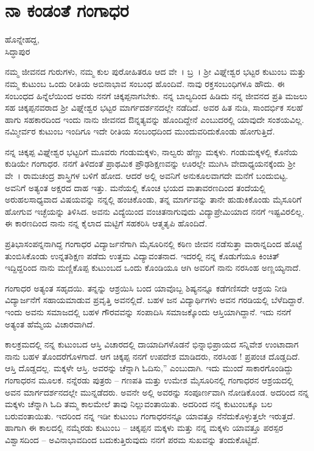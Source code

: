 \chapter{ನಾ ಕಂಡಂತೆ ಗಂಗಾಧರ}

\begin{center}
\smallskip

ಹೊನ್ನೇಹದ್ದ,\\ 
ಸಿದ್ಧಾಪುರ
\addrule
\end{center}

ನಮ್ಮ ಜೀವನದ ಗುರುಗಳು, ನಮ್ಮ ಕುಲ ಪುರೋಹಿತರೂ ಆದ ವೇ~। ಬ್ರ~। ಶ್ರೀ ವಿಘ್ನೇಶ್ವರ ಭಟ್ಟರ ಕುಟುಂಬ ಮತ್ತು ನಮ್ಮ ಕುಟುಂಬ ಒಂದು ರೀತಿಯ ಅಬಿನಾಭಾವ ಸಂಬಂಧ ಹೊಂದಿವೆ. ನಾವು ರಕ್ತಸಂಬಂಧಿಗಳೂ ಹೌದು. ಈ ಸಂಬಂಧದ ಹಿನ್ನೆಲೆಯಿಂದ ಅವರು ನನಗೆ ಚಿಕ್ಕಪ್ಪನಾಗಬೇಕು. ನನ್ನ ಬಾಲ್ಯದಿಂದ ಹಿಡಿದು ನನ್ನ ಜೀವನದ ಪ್ರತಿ ಮಜಲು ಸಹ ಚಿಕ್ಕಪ್ಪನವರಾದ ಶ್ರೀ ವಿಘ್ನೇಶ್ವರ ಭಟ್ಟರ ಮಾರ್ಗದರ್ಶನದಲ್ಲೇ ನಡೆದಿದೆ. ಅವರ ಹಿತ ನುಡಿ, ಸಾಂದರ್ಭಿಕ ಸಲಹೆ ಹಾಗು ಸಹಕಾರದಿಂದ ಇಂದು ನಾನು ಜೀವನದ ಔನ್ನತ್ಯವನ್ನು ಹೊಂದಿದ್ದೇನೆ ಎಂಬುದರಲ್ಲಿ ಯಾವುದೇ ಸಂಶಯವಿಲ್ಲ. ನಮ್ಮೀರ್ವರ ಕುಟುಂಬ ಇಂದಿಗೂ ಇದೇ ರೀತಿಯ ಸಂಬಂಧದಿಂದ ಮುಂದುವರಿದುಕೊಂಡು ಹೋಗುತ್ತಿದೆ.

ನನ್ನ ಚಿಕ್ಕಪ್ಪ ವಿಘ್ನೇಶ್ವರ ಭಟ್ಟರಿಗೆ ಮೂವರು ಗಂಡುಮಕ್ಕಳು, ನಾಲ್ವರು ಹೆಣ್ಣು ಮಕ್ಕಳು. ಗಂಡುಮಕ್ಕಳಲ್ಲಿ ಕೊನೆಯ ಕುಡಿಯೇ ಗಂಗಾಧರ. ನನಗೆ ತಿಳಿದಂತೆ ಪ್ರಾಥಮಿಕ ಪ್ರೌಢಶಿಕ್ಷಣವನ್ನು ಊರಲ್ಲೇ ಮುಗಿಸಿ ವೇದಾಧ್ಯಯನಕ್ಕೆಂದು ಶ್ರೀ ವೇ~। ರಾಮಚಂದ್ರ ಶಾಸ್ತ್ರಿಗಳ ಬಳಿಗೆ ಹೋದ. ಆದರೆ ಅಲ್ಲಿ ಅವನಿಗೆ ಅನುಕೂಲವಾಗದೇ ಮನೆಗೆ ಬಂದುಬಿಟ್ಟ. ಅವನಿಗೆ ಅತ್ಯಂತ ಅಕ್ಷರದ ದಾಹ ಇತ್ತು. ಮನೆಯಲ್ಲಿ ಕೊಂಚ ಭಯದ ವಾತಾವರಣದಿಂದ ತಂದೆಯಲ್ಲಿ ಅರುಹಲಸಾಧ್ಯವಾದ ವಿಷಯವನ್ನು ನನ್ನಲ್ಲಿ ಹಂಚಿಕೊಂಡು, ತನ್ನ ಮಾರ್ಗವನ್ನು ತಾನೇ ಹುಡುಕಿಕೊಂಡು ಮೈಸೂರಿಗೆ ಹೋಗುವ ಇಚ್ಛೆಯನ್ನು ತಿಳಿಸಿದ. ಅವನು ವಿದ್ಯೆಯಿಂದ ವಂಚಿತನಾಗುವುದು ವಿದ್ಯಾಪ್ರೇಮಿಯಾದ ನನಗೆ ಇಷ್ಟವಿರಲಿಲ್ಲ.  ಈ ಕಾರಣದಿಂದ ನಾನು ನನ್ನ ಕೈಲಾದ ಮಟ್ಟಿಗೆ ಸಹಕರಿಸಿ  ಆತ್ಮತೃಪಿ ಹೊಂದಿದೆ.

ಪ್ರತಿಭಾಸಂಪನ್ನನಾಗಿದ್ದ ಗಂಗಾಧರ ವಿದ್ಯಾರ್ಜನೆಗಾಗಿ ಮೈಸೂರಿನಲ್ಲಿ ಕಠಿಣ ಜೀವನ ನಡೆಸುತ್ತಾ ವಾರಾನ್ನದಿಂದ ಹೊಟ್ಟೆ ತುಂಬಿಸಿಕೊಂಡು  ಉನ್ನತಶಿಕ್ಷಣ ಪಡೆದು ಉತ್ತಮ ವಿದ್ಯಾವಂತನಾದ. ಇದರಲ್ಲಿ ನನ್ನ ಕೊಡುಗೆಯೂ ಕಿಂಚಿತ್ ಇದ್ದಿದ್ದರಿಂದ ನಾನು ಮಣ್ಣಿಕೊಪ್ಪ ಕುಟುಂಬದ ಒಂದು ಕೊಂಡಿಯೂ ಆಗಿ ಅವರಿಗೆ ನಾನು ನರಸಿಂಹ ಅಣ್ಣಯ್ಯನಾದೆ. 

ಗಂಗಾಧರ ಅತ್ಯಂತ ಸಹೃದಯಿ. ತನ್ನನ್ನು ಆಶ್ರಯಿಸಿ ಬಂದ ಯಾವೊಬ್ಬ ಶಿಷ್ಯನನ್ನೂ ಕಡೆಗಣಿಸದೇ ಆಶ್ರಯ ನೀಡಿ ವಿದ್ಯಾರ್ಜನೆಗೆ ಸಹಾಯಮಾಡುವ ಪ್ರವೃತ್ತಿ ಅವನಲ್ಲಿದೆ. ಬಹಳ ಜನ ವಿದ್ಯಾರ್ಥಿಗಳು ಅವನ ಗರಡಿಯಲ್ಲಿ ಬೆಳೆದಿದ್ದಾರೆ. ಇಂದು ಅವನು ಸಮಾಜದಲ್ಲಿ ಬಹಳ ಗೌರವವನ್ನು ಸಂಪಾದಿಸಿ ಸಮಾಜಕ್ಕೊಂದು ಆಸ್ತಿಯಾಗಿದ್ದಾನೆ. ಇದು ನನಗೆ ಅತ್ಯಂತ ಹೆಮ್ಮೆಯ ವಿಚಾರವಾಗಿದೆ.

ಕಾಲಕ್ರಮದಲ್ಲಿ ನನ್ನ ಕುಟುಂಬದ ಆಸ್ತಿ ವಿಚಾರದಲ್ಲಿ ದಾಯಾದಿಗಳೊಡನೆ ಭಿನ್ನಾಭಿಪ್ರಾಯದ ಸನ್ನಿವೇಶ ಉಂಟಾದಾಗ ನಾನು ಬಹಳ ತೊಂದರೆಗೊಳಗಾದೆ. ಆಗ ಚಿಕ್ಕಪ್ಪ ನನಗೆ ಉಪದೇಶ ಮಾಡಿದರು, ನರಸಿಂಹ ! ಪ್ರಪಂಚ ದೊಡ್ಡದಿದೆ. ಆಸ್ತಿ ದೊಡ್ಡದಲ್ಲ. ಮಕ್ಕಳೇ ಆಸ್ತಿ. ಅವರನ್ನು ಚೆನ್ನಾಗಿ ಓದಿಸು,” ಎಂಬುದಾಗಿ. ಇದು ಮುಂದೆ ಸಾಕಾರಗೊಂಡಿದ್ದು ಗಂಗಾಧರನ ಮೂಲಕ. ನನ್ನೆರಡು ಪುತ್ರರು – ಗಣಪತಿ ಮತ್ತು ಉಮೇಶ ಮೈಸೂರಿನಲ್ಲಿ ಗಂಗಾಧರನ ಆಶ್ರಯದಲ್ಲಿ ಅವನ ಮಾರ್ಗದರ್ಶನದಲ್ಲೇ ಮುನ್ನಡೆದರು. ಅವನೇ ಅಲ್ಲಿ ಅವರನ್ನು ಸಂಪೂರ್ಣವಾಗಿ ನೋಡಿಕೊಂಡ. ಅದರಿಂದ ನನ್ನ ಮಕ್ಕಳು ಚೆನ್ನಾಗಿ ಓದಿ ತಮ್ಮ ಕಾಲಮೇಲೆ ತಾವು ನಿಲ್ಲುವಂತಾಯಿತು.  ಅದರಿಂದ ನನ್ನ ಕುಟುಂಬಕ್ಕೂ  ಬಲ ಬರುವಂತಾಯಿತು. ಇದರಿಂದ ನನ್ನ ಇಡೀ ಕುಟುಂಬ ಗಂಗಾಧರನನ್ನೂ ಯಾವತ್ತೂ ನೆನೆದುಕೊಳ್ಳುತ್ತಲೇ ಇರುತ್ತದೆ. ಹಾಗಾಗಿ ಈ ಕಾಲದಲ್ಲಿ ನಮ್ಮೆರಡು ಕುಟುಂಬ – ಚಿಕ್ಕಪ್ಪನ ಮಕ್ಕಳು ಮತ್ತು ನನ್ನ ಮಕ್ಕಳು ಯಾವತ್ತೂ ಪರಸ್ಪರ ವಿಶ್ವಾಸದಿಂದ – ಅವಿನಾಭಾವದಿಂದ ಬದುಕುತ್ತಿರುವುದು ನನಗೆ ಪರಮ ಸುಖವನ್ನು ತಂದುಕೊಟ್ಟಿದೆ. 

